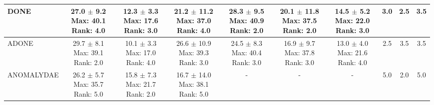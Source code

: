 \begin{longtable}{|l|c|c|c|c|c|c|c|c|c|}
DONE & \makecell{ 27.0 $\pm$ 9.2 \\ \scriptsize Max: 40.1 \\ \scriptsize Rank: 4.0 } & \makecell{ 12.3 $\pm$ 3.3 \\ \scriptsize Max: 17.6 \\ \scriptsize Rank: 3.0 } & \makecell{ 21.2 $\pm$ 11.2 \\ \scriptsize Max: 37.0 \\ \scriptsize Rank: 4.0 } & \makecell{ 28.3 $\pm$ 9.5 \\ \scriptsize Max: 40.9 \\ \scriptsize Rank: 2.0 } & \makecell{ 20.1 $\pm$ 11.8 \\ \scriptsize Max: 37.5 \\ \scriptsize Rank: 2.0 } & \makecell{ 14.5 $\pm$ 5.2 \\ \scriptsize Max: 22.0 \\ \scriptsize Rank: 3.0 } & 3.0 & 2.5 & 3.5 \\ \hline 
ADONE & \makecell{ 29.7 $\pm$ 8.1 \\ \scriptsize Max: 39.1 \\ \scriptsize Rank: 2.0 } & \makecell{ 10.1 $\pm$ 3.3 \\ \scriptsize Max: 17.0 \\ \scriptsize Rank: 4.0 } & \makecell{ 26.6 $\pm$ 10.9 \\ \scriptsize Max: 39.3 \\ \scriptsize Rank: 3.0 } & \makecell{ 24.5 $\pm$ 8.3 \\ \scriptsize Max: 40.4 \\ \scriptsize Rank: 3.0 } & \makecell{ 16.9 $\pm$ 9.7 \\ \scriptsize Max: 37.8 \\ \scriptsize Rank: 3.0 } & \makecell{ 13.0 $\pm$ 4.0 \\ \scriptsize Max: 21.6 \\ \scriptsize Rank: 4.0 } & 2.5 & 3.5 & 3.5 \\ \hline 
ANOMALYDAE & \makecell{ 26.2 $\pm$ 5.7 \\ \scriptsize Max: 35.7 \\ \scriptsize Rank: 5.0 } & \makecell{ 15.8 $\pm$ 7.3 \\ \scriptsize Max: 21.7 \\ \scriptsize Rank: 2.0 } & \makecell{ 16.7 $\pm$ 14.0 \\ \scriptsize Max: 38.1 \\ \scriptsize Rank: 5.0 } & - & - & - & 5.0 & 2.0 & 5.0 \\ \hline 

\end{longtable}
